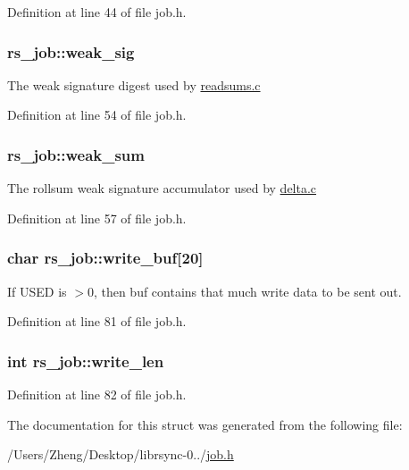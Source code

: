 Definition at line 44 of file job.\+h.

\hypertarget{structrs__job_a89ca09a7be40ac8e584917d577b22f66}{}
\subsubsection[{weak\+\_\+sig}]{ rs\+\_\+job\+::weak\+\_\+sig}\label{structrs__job_a89ca09a7be40ac8e584917d577b22f66}
The weak signature digest used by \hyperlink{readsums_8c}{readsums.\+c} 

Definition at line 54 of file job.\+h.

\hypertarget{structrs__job_a4415237bfe78e4faced69db92503d705}{}
\subsubsection[{weak\+\_\+sum}]{ rs\+\_\+job\+::weak\+\_\+sum}\label{structrs__job_a4415237bfe78e4faced69db92503d705}
The rollsum weak signature accumulator used by \hyperlink{delta_8c}{delta.\+c} 

Definition at line 57 of file job.\+h.

\hypertarget{structrs__job_a038caf8e385b0cdfc302ff0f717aa43c}{}
\subsubsection[{write\+\_\+buf}]{\setlength{\rightskip}{0pt plus 5cm}char rs\+\_\+job\+::write\+\_\+buf\mbox{[}20\mbox{]}}\label{structrs__job_a038caf8e385b0cdfc302ff0f717aa43c}
If U\+S\+E\+D is $>$0, then buf contains that much write data to be sent out. 

Definition at line 81 of file job.\+h.

\hypertarget{structrs__job_a62bcb053196b1288ddd82ed31a4c0a94}{}
\subsubsection[{write\+\_\+len}]{\setlength{\rightskip}{0pt plus 5cm}int rs\+\_\+job\+::write\+\_\+len}\label{structrs__job_a62bcb053196b1288ddd82ed31a4c0a94}


Definition at line 82 of file job.\+h.



The documentation for this struct was generated from the following file\+:\begin{DoxyCompactItemize}
\item 
/\+Users/\+Zheng/\+Desktop/librsync-\/0../\hyperlink{job_8h}{job.\+h}\end{DoxyCompactItemize}
